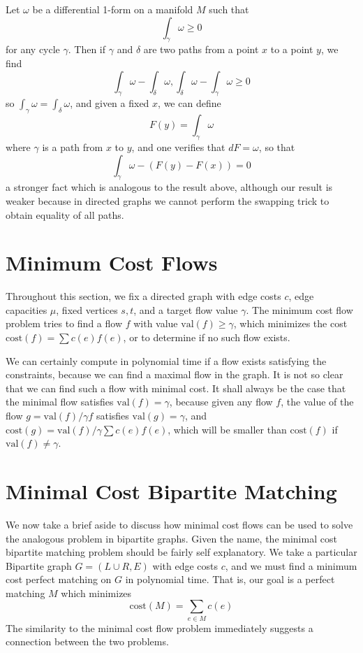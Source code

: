 Let $\omega$ be a differential 1-form on a manifold $M$ such that
%
\[ \int_\gamma \omega \geq 0 \]
%
for any cycle $\gamma$. Then if $\gamma$ and $\delta$ are two paths from a point $x$ to a point $y$, we find
%
\[ \int_\gamma \omega - \int_\delta \omega, \int_\delta \omega - \int_\gamma \omega \geq 0 \]
%
so $\int_\gamma \omega = \int_\delta \omega$, and given a fixed $x$, we can define
%
\[ F(y) = \int_\gamma \omega \]
%
where $\gamma$ is a path from $x$ to $y$, and one verifies that $dF = \omega$, so that
%
\[ \int_\gamma \omega - (F(y) - F(x)) = 0 \]
%
a stronger fact which is analogous to the result above, although our result is weaker because in directed graphs we cannot perform the swapping trick to obtain equality of all paths.

\section{Minimum Cost Flows}

Throughout this section, we fix a directed graph with edge costs $c$, edge capacities $\mu$, fixed vertices $s,t$, and a target flow value $\gamma$. The minimum cost flow problem tries to find a flow $f$ with value $\text{val}(f) \geq \gamma$, which minimizes the cost $\text{cost}(f) = \sum c(e) f(e)$, or to determine if no such flow exists.

We can certainly compute in polynomial time if a flow exists satisfying the constraints, because we can find a maximal flow in the graph. It is not so clear that we can find such a flow with minimal cost. It shall always be the case that the minimal flow satisfies $\text{val}(f) = \gamma$, because given any flow $f$, the value of the flow $g = \text{val}(f)/\gamma f$ satisfies $\text{val}(g) = \gamma$, and $\text{cost}(g) = \text{val}(f)/\gamma \sum c(e) f(e)$, which will be smaller than $\text{cost}(f)$ if $\text{val}(f) \neq \gamma$.

\section{Minimal Cost Bipartite Matching}

We now take a brief aside to discuss how minimal cost flows can be used to solve the analogous problem in bipartite graphs. Given the name, the minimal cost bipartite matching problem should be fairly self explanatory. We take a particular Bipartite graph $G = (L \cup R, E)$ with edge costs $c$, and we must find a minimum cost perfect matching on $G$ in polynomial time. That is, our goal is a perfect matching $M$ which minimizes
%
\[ \text{cost}(M) = \sum_{e \in M} c(e) \]
%
The similarity to the minimal cost flow problem immediately suggests a connection between the two problems.

